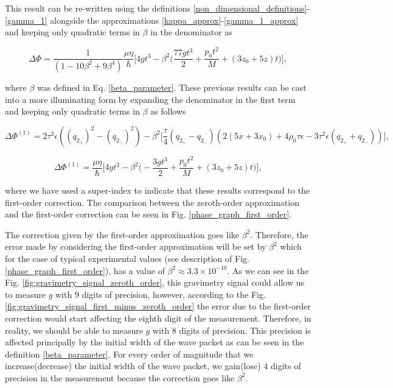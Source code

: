 \documentclass{article}
\begin{document}
This result can be re-written using the definitions \ref{non_dimensional_definitions}-\ref{gamma_1} alongside the approximations \ref{kappa_approx}-\ref{gamma_1_approx} and keeping only quadratic terms in $\beta$ in the denominator as

\begin{equation}
\Delta \Phi = \frac{1}{\left(1 -10 \beta ^2 + 9 \beta ^4\right)} \frac{\mu \eta}{\hbar}
\Bigg[ 4 g t^3
- \beta ^2 \bigg(\frac{77 g t^3}{2} + \frac{p_{0}t^2}{M}  + (3z_{0}+5z)t \bigg) \Bigg],
\end{equation}

where $\beta$ was defined in Eq. \ref{beta_parameter}.
These previous results can be cast into a more illuminating form by expanding the denominator in the first term  and keeping only quadratic terms in $\beta$ as follows

\begin{equation}\label{gravimetry_signal_first_order_approx}
\Delta \Phi ^{(1)} = 
 2 \tau ^3 \epsilon \text{} \left( \text{$(q_{2_{+}})$}^2- \text{$(q_{2_{-}})$}^2\right)
- \beta ^2 \bigg[ \frac{\tau }{4} (\text{$q_{2_{+}}$}-\text{$q_{2_{-}}$}) \left(2 \left(5 x+3 x_0\right) +4 \rho _0 \tau  \epsilon - 3\tau ^2 \epsilon  \text{} (\text{$q_{2_{+}}$}+\text{$q_{2_{-}}$}) \right) \bigg],
\end{equation}

\begin{equation}\label{gravimetry_signal_first_order_approx_dimensional}
\Delta \Phi ^{(1)} =  \frac{\mu \eta}{\hbar}
\Bigg[ 4 g t^3
- \beta ^2 \bigg(-\frac{3 g t^3}{2} + \frac{p_{0}t^2}{M}  + (3z_{0}+5z)t \bigg) \Bigg],
\end{equation}

where we have used a super-index to indicate that these results correspond to the first-order correction.
The comparison between the zeroth-order approximation and the first-order correction can be seen in Fig. \ref{phase_graph_first_order}.

The correction given by the first-order approximation goes like $\beta ^2$. Therefore, the error made by considering the first-order approximation will be set by $\beta ^2$ which for the case of typical experimental values (see description of Fig. \ref{phase_graph_first_order}), has a value of $\beta ^2 \approx 3.3 \times 10^{-10}$. As we can see in the Fig. \ref{fig:gravimetry_signal_zeroth_order}, this gravimetry signal could allow us to measure $g$ with $9$ digits of precision, however, according to the Fig. \ref{fig:gravimetry_signal_first_minus_zeroth_order} the error due to the first-order correction would start affecting the eighth digit of the measurement. Therefore, in reality, we should be able to measure $g$ with $8$ digits of precision. This precision is affected principally by the initial width of the wave packet as can be seen in the definition \ref{beta_parameter}. For every order of magnitude that we increase(decrease) the initial width of the wave packet, we gain(lose) $4$ digits of precision in the measurement because the correction goes like $\beta ^2$.
\end{document}
